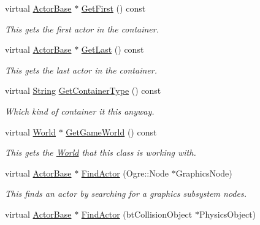 \begin{DoxyCompactItemize}
virtual \hyperlink{classphys_1_1ActorBase}{ActorBase} $\ast$ \hyperlink{classphys_1_1ActorContainerVector_a55ceecd017455f3185aa62798811e3c6}{GetFirst} () const 
\begin{DoxyCompactList}\small\item\em This gets the first actor in the container. \item\end{DoxyCompactList}\item 
virtual \hyperlink{classphys_1_1ActorBase}{ActorBase} $\ast$ \hyperlink{classphys_1_1ActorContainerVector_a211f6e419ef0b753cecf2c662a54511e}{GetLast} () const 
\begin{DoxyCompactList}\small\item\em This gets the last actor in the container. \item\end{DoxyCompactList}\item 
virtual \hyperlink{namespacephys_aa03900411993de7fbfec4789bc1d392e}{String} \hyperlink{classphys_1_1ActorContainerVector_ae18c29b30d840e0f4fc9b553dd5ca32c}{GetContainerType} () const 
\begin{DoxyCompactList}\small\item\em Which kind of container it this anyway. \item\end{DoxyCompactList}\item 
virtual \hyperlink{classphys_1_1World}{World} $\ast$ \hyperlink{classphys_1_1ActorContainerVector_a5519eb0000073a2f397e158bfc368349}{GetGameWorld} () const 
\begin{DoxyCompactList}\small\item\em This gets the \hyperlink{classphys_1_1World}{World} that this class is working with. \item\end{DoxyCompactList}\item 
virtual \hyperlink{classphys_1_1ActorBase}{ActorBase} $\ast$ \hyperlink{classphys_1_1ActorContainerVector_ad01cf1452bda36cee175ae0e54d509cc}{FindActor} (Ogre::Node $\ast$GraphicsNode)
\begin{DoxyCompactList}\small\item\em This finds an actor by searching for a graphics subsystem nodes. \item\end{DoxyCompactList}\item 
virtual \hyperlink{classphys_1_1ActorBase}{ActorBase} $\ast$ \hyperlink{classphys_1_1ActorContainerVector_a5ebcdeb3018f3baf92154ddec79cd054}{FindActor} (btCollisionObject $\ast$PhysicsObject)

\end{DoxyCompactItemize}
